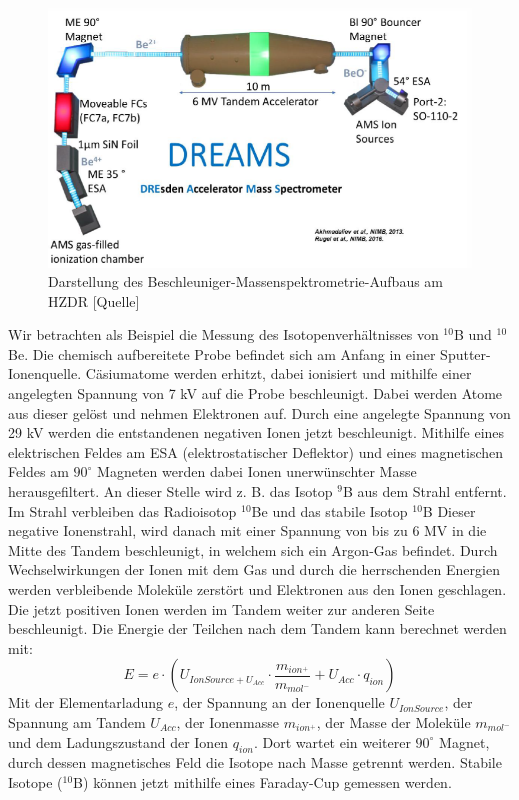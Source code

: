 \begin{figure}[ht]
  \includegraphics[width=\linewidth]{../Bilder/dreams.png}
  \caption{Darstellung des Beschleuniger-Massenspektrometrie-Aufbaus am HZDR [Quelle]}
  \label{dreams}
\end{figure}
Wir betrachten als Beispiel die Messung des Isotopenverhältnisses von  $^{10}$B und  $^{10}$Be.
Die chemisch aufbereitete Probe befindet sich am Anfang in einer Sputter-Ionenquelle.
Cäsiumatome werden erhitzt, dabei ionisiert und mithilfe einer angelegten Spannung von 7 kV auf die Probe beschleunigt.
Dabei werden Atome aus dieser gelöst und nehmen Elektronen auf.
Durch eine angelegte Spannung von 29 kV werden die entstandenen negativen Ionen jetzt beschleunigt.
Mithilfe eines elektrischen Feldes am ESA (elektrostatischer Deflektor) und eines magnetischen Feldes am $90^{\circ}$ Magneten werden dabei Ionen unerwünschter Masse herausgefiltert.
An dieser Stelle wird z. B. das Isotop  $^{9}$B aus dem Strahl entfernt.
Im Strahl verbleiben das Radioisotop $^{10}$Be und das stabile Isotop $^{10}$B
Dieser negative Ionenstrahl, wird danach mit einer Spannung von bis zu $6$ MV in die Mitte des Tandem beschleunigt, in welchem sich ein Argon-Gas befindet.
Durch Wechselwirkungen der Ionen mit dem Gas und durch die herrschenden Energien werden verbleibende Moleküle zerstört und Elektronen aus den Ionen geschlagen.
Die jetzt positiven Ionen werden im Tandem weiter zur anderen Seite beschleunigt.
Die Energie der Teilchen nach dem Tandem kann berechnet werden mit:
\begin{equation}
E = e \cdot (U_{IonSource + U_{Acc}} \cdot \frac{m_{ion^+}}{m_{mol^-}} + U_{Acc}\cdot q_{ion})
\end{equation}
Mit der Elementarladung $e$, der Spannung an der Ionenquelle $U_{IonSource}$, der Spannung am Tandem $U_{Acc}$, der Ionenmasse $m_{ion^+}$, der Masse der Moleküle $m_{mol^-}$ und dem Ladungszustand der Ionen $q_{ion}$.
Dort wartet ein weiterer $90^{\circ}$ Magnet, durch dessen magnetisches Feld die Isotope nach Masse getrennt werden.
Stabile Isotope ($^{10}$B) können jetzt mithilfe eines Faraday-Cup gemessen werden.

